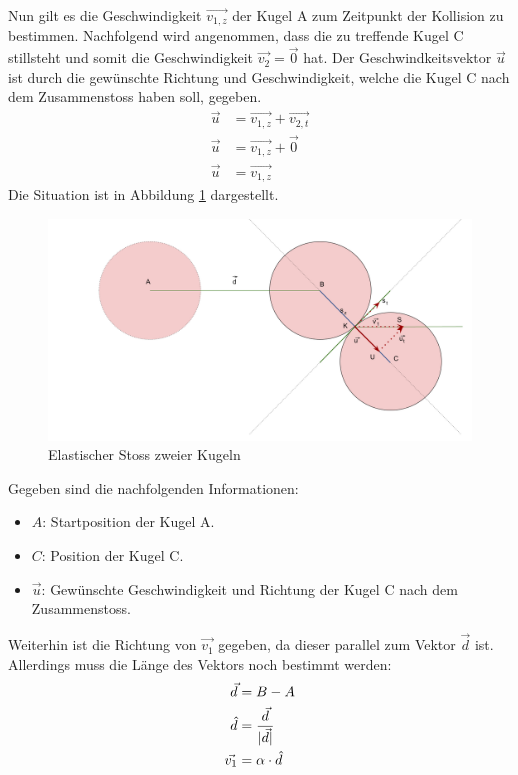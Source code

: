 Nun gilt es die Geschwindigkeit $\vec{v_{1,z}}$ der Kugel A zum Zeitpunkt der Kollision zu bestimmen.
Nachfolgend wird angenommen, dass die zu treffende Kugel C stillsteht und somit die Geschwindigkeit $\vec{v_2} = \vec{0}$ hat.
Der Geschwindkeitsvektor $\vec{u}$ ist durch die gewünschte Richtung und Geschwindigkeit,
welche die Kugel C nach dem Zusammenstoss haben soll, gegeben.
\begin{align}
    \vec{u} &= \vec{v_{1,z}} + \vec{v_{2,t}}\\
    \vec{u} &= \vec{v_{1,z}} + \vec{0}\\
    \vec{u} &= \vec{v_{1,z}}
\end{align}
Die Situation ist in Abbildung \ref{fig:elasticCollisionOfTwoBalls} dargestellt.

\begin{figure}[h!]
    \begin{center}
        \includegraphics[width=0.6\linewidth]{../common/03_billiard_ai/resources/22_kollision_rueckwaerts.png}
    \end{center}
    \caption{Elastischer Stoss zweier Kugeln}
    \label{fig:elasticCollisionOfTwoBalls}
\end{figure}

Gegeben sind die nachfolgenden Informationen:
\begin{itemize}
    \item $A$: Startposition der Kugel A.
    \item $C$: Position der Kugel C.
    \item $\vec{u}$: Gewünschte Geschwindigkeit und Richtung der Kugel C nach dem Zusammenstoss.
\end{itemize}

Weiterhin ist die Richtung von $\vec{v_1}$ gegeben, da dieser parallel zum Vektor $\vec{d}$ ist.
Allerdings muss die Länge des Vektors noch bestimmt werden:
\begin{align}
    \vec{d} &= B - A\\
    \hat{d} &= \frac{\vec{d}}{\lvert \vec{d} \rvert}\\
    \vec{v_1} &= \alpha \cdot \hat{d}
\end{align}

